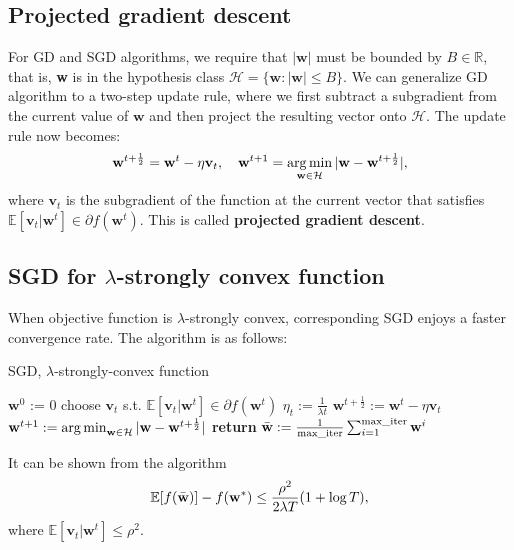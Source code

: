 \documentclass[../main.tex]{subfiles}
\begin{document}
\setlength{\parindent}{0pt}
\subsection{Projected gradient descent}
For GD and SGD algorithms, we require that $|\textbf{w}|$ must be bounded by $B\in \mathbb{R}$, that is, \textbf{w} is in the hypothesis class $\mathcal{H}=\{\textbf{w}: |\textbf{w}|\leq B\}$. We can generalize GD algorithm to a two-step update rule, where we first subtract a subgradient from the current value of $\textbf{w}$ and then project the resulting vector onto $\mathcal{H}$. The update rule now becomes: $$\textbf{w}^{t+\frac{1}{2}}=\textbf{w}^t-\eta\textbf{v}_t, \quad \textbf{w}^{t+1}=\operatorname*{arg\,min}_{\textbf{w}\in \mathcal{H}}|\textbf{w}-\textbf{w}^{t+\frac{1}{2}}|,$$
where $\textbf{v}_t$ is the subgradient of the function at the current vector that satisfies $\mathbb{E}[\textbf{v}_t|\textbf{w}^t]\in \partial f(\textbf{w}^t)$. This is called \textbf{projected gradient descent}.

\subsection{SGD for $\lambda$-strongly convex function}
When objective function is $\lambda$-strongly convex, corresponding SGD enjoys a faster convergence rate. The algorithm is as follows:
\smallskip\begin{algorithm}[H]
\caption{SGD, $\lambda$-strongly-convex function}\label{sgd-strongly-convex}
\begin{algorithmic}[5]
  \State $\textbf{w}^0$ := 0
    \State choose $\textbf{v}_t$ s.t. $\mathbb{E}[\textbf{v}_t|\textbf{w}^t]\in \partial f(\textbf{w}^t)$
    \State $\eta_t:=\frac{1}{\lambda t}$
    \State $\textbf{w}^{t+\frac{1}{2}}:=\textbf{w}^t-\eta\textbf{v}_t$
    \State $\textbf{w}^{t+1}:=\operatorname*{arg\,min}_{\textbf{w}\in \mathcal{H}}|\textbf{w}-\textbf{w}^{t+\frac{1}{2}}|$
  \EndFor
  \State \textbf{return} $\Bar{\textbf{w}}:=\frac{1}{\text{max\_iter}}\sum_{i=1}^{\text{max\_iter}}\textbf{w}^i$
\EndProcedure
\end{algorithmic}
\end{algorithm}\smallskip
It can be shown from the algorithm $$\mathbb{E}[f(\Bar{\textbf{w}})]-f(\textbf{w}^*)\leq \frac{\rho^2}{2\lambda T}(1+\log T),$$
where $\mathbb{E}[\textbf{v}_t|\textbf{w}^t]\leq \rho^2$.
\end{document}

